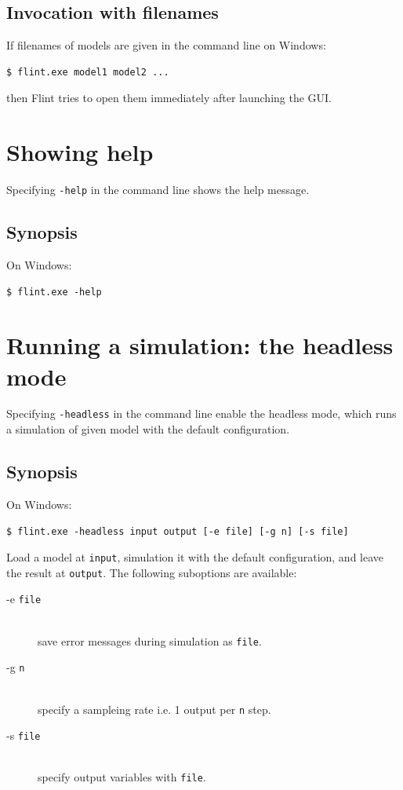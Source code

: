 \documentclass[a4paper,10pt]{report}
\begin{document}
\subsection{Invocation with filenames}
If filenames of models are given in the command line on Windows:
\begin{verbatim}
$ flint.exe model1 model2 ...
\end{verbatim}
then Flint tries to open them immediately after launching the GUI.

\section{Showing help}
Specifying {\tt -help} in the command line shows the help message.

\subsection{Synopsis}
On Windows:
\begin{verbatim}
$ flint.exe -help
\end{verbatim}

\section{Running a simulation: the headless mode}
Specifying {\tt -headless} in the command line enable the headless mode, which
runs a simulation of given model with the default configuration.

\subsection{Synopsis}
On Windows:
\begin{verbatim}
$ flint.exe -headless input output [-e file] [-g n] [-s file]
\end{verbatim}
Load a model at {\tt input}, simulation it with the default configuration,
and leave the result at {\tt output}.
The following suboptions are available:
\begin{description}
\item[-e {\tt file}] \hfill \\
  save error messages during simulation as {\tt file}.
\item[-g {\tt n}] \hfill \\
  specify a sampleing rate i.e. 1 output per {\tt n} step.
\item[-s {\tt file}] \hfill \\
  specify output variables with {\tt file}.
\end{description}
\end{document}
